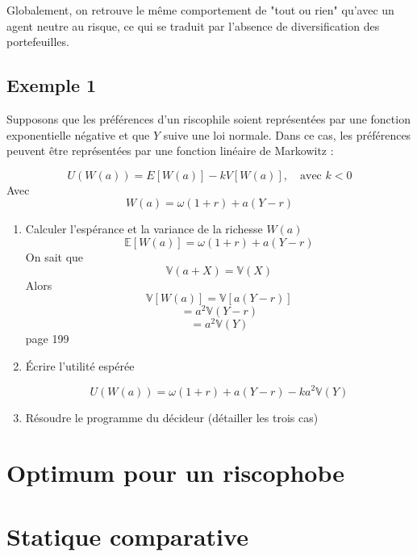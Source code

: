 \documentclass[a4paper, 12pt]{report}
\begin{document}
Globalement, on retrouve le même comportement de "tout ou rien" qu'avec un agent neutre au risque, ce qui se traduit par l'absence de diversification des portefeuilles.

\subsection{Exemple 1}

Supposons que les préférences d'un riscophile soient représentées par une fonction exponentielle négative et que \( Y \) suive une loi normale. Dans ce cas, les préférences peuvent être représentées par une fonction linéaire de Markowitz :

\[
U(W(a)) = E[W(a)] - kV[W(a)], \quad \text{avec } k < 0
\]
Avec
\[ W(a)=\omega(1+r)+a(Y-r) \]
\begin{enumerate}
	\item Calculer l'espérance et la variance de la richesse \( W(a) \)
\[ \mathbb{E}\left[W(a) \right]= \omega(1+r)+a(Y-r) \]
\noindent
On sait que 
\[ \mathbb{V}(a+X)=\mathbb{V}(X) \]
Alors
\[ \mathbb{V}\left[W(a) \right]=\mathbb{V}\left[ a(Y-r)\right]  \]
\[= a^2 \mathbb{V}(Y-r) \]
\[= a^2 \mathbb{V}(Y)\]
page 199
	\item Écrire l'utilité espérée
	
\[ U(W(a)) =  \omega(1+r)+a(Y-r) - ka^2 \mathbb{V}(Y) \]	
	
	\item Résoudre le programme du décideur (détailler les trois cas) 
\end{enumerate}

\section{Optimum pour un riscophobe}



\section{Statique comparative}
\end{document}
